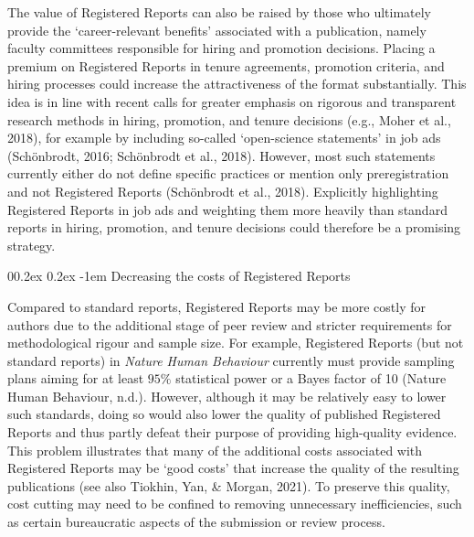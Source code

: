 \documentclass[
  ,man,mask,floatsintext]{apa6}
\makeatletter
\let\oldparagraph\paragraph
\renewcommand{\paragraph}[1]{\oldparagraph{#1}\mbox{}}
\renewcommand{\paragraph}{\@startsection{paragraph}{4}{\parindent}%
  {0\baselineskip \@plus 0.2ex \@minus 0.2ex}%
  {-1em}%
  {\normalfont\normalsize\bfseries\itshape\typesectitle}}
\makeatother
\begin{document}
The value of Registered Reports can also be raised by those who ultimately provide the `career-relevant benefits' associated with a publication, namely faculty committees responsible for hiring and promotion decisions.
Placing a premium on Registered Reports in tenure agreements, promotion criteria, and hiring processes could increase the attractiveness of the format substantially.
This idea is in line with recent calls for greater emphasis on rigorous and transparent research methods in hiring, promotion, and tenure decisions (e.g., Moher et al., 2018), for example by including so-called `open-science statements' in job ads (Schönbrodt, 2016; Schönbrodt et al., 2018).
However, most such statements currently either do not define specific practices or mention only preregistration and not Registered Reports (Schönbrodt et al., 2018).
Explicitly highlighting Registered Reports in job ads and weighting them more heavily than standard reports in hiring, promotion, and tenure decisions could therefore be a promising strategy.

\par\vspace{0.2\baselineskip}

\hypertarget{decreasing-the-costs-of-registered-reports}{%
\paragraph{Decreasing the costs of Registered Reports}\label{decreasing-the-costs-of-registered-reports}}

Compared to standard reports, Registered Reports may be more costly for authors due to the additional stage of peer review
and stricter requirements for methodological rigour and sample size.
For example, Registered Reports (but not standard reports) in \emph{Nature Human Behaviour} currently must provide sampling plans aiming for at least \(95\%\) statistical power or a Bayes factor of 10 (Nature Human Behaviour, n.d.).
However, although it may be relatively easy to lower such standards,
doing so would also lower the quality of published Registered Reports and thus partly defeat their purpose of providing high-quality evidence.
This problem illustrates that many of the additional costs associated with Registered Reports may be `good costs' that increase the quality of the resulting publications (see also Tiokhin, Yan, \& Morgan, 2021).
To preserve this quality, cost cutting may need to be confined to removing unnecessary inefficiencies, such as certain bureaucratic aspects of the submission or review process.
\end{document}
